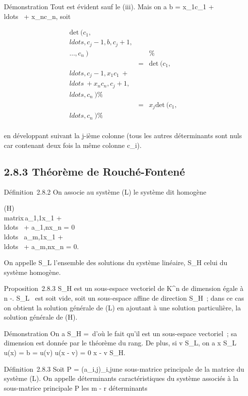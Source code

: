 \documentclass[]{article}
\begin{document}
Démonstration Tout est évident sauf le (iii). Mais on a b =
x_1c_1 +
\\ldots~ +
x_nc_n, soit

\begin{align*}
\mathrm{det}~
(c_1,\\ldots,c_j-1,b,c_j+1,\\\ldots,c_n~)&&
\%& \\ & =&
\mathrm{det}~
(c_1,\\ldots,c_j-1,x_1c_1~
+ \\ldots~ +
x_nc_n,c_j+1,\\ldots,c_n~)\%&
\\ & =&
x_j \mathrm{det}~
(c_1,\\ldots,c_n~)
\%& \\ \end{align*}

en développant suivant la j-ième colonne (tous les autres déterminants
sont nuls car contenant deux fois la même colonne c_i).

\subsection{2.8.3 Théorème de Rouché-Fontené}

Définition~2.8.2 On associe au système (L) le système dit homogène

(H)\quad \left
\\matrix\,a_1,1x_1
+ \\ldots~ +
a_1,nx_n = 0 \cr
\\ldots~
\cr a_m,1x_1 +
\\ldots~ +
a_m,nx_n = 0\right .

On appelle S_L l'ensemble des solutions du système linéaire,
S_H celui du système homogène.

Proposition~2.8.3 S_H est un sous-espace vectoriel de
K^n de dimension égale à n
-\mathrmrgL. S_L~
est soit vide, soit un sous-espace affine de direction S_H~;
dans ce cas on obtient la solution générale de (L) en ajoutant à une
solution particulière, la solution générale de (H).

Démonstration On a S_H =\
\mathrmKeru d'où le fait qu'il est un sous-espace
vectoriel~; sa dimension est donnée par le théorème du rang. De plus, si
v \in S_L, on a x \in S_L \Leftrightarrow
u(x) = b = u(v) \Leftrightarrow u(x - v) = 0
\Leftrightarrow x - v \in S_H.

Définition~2.8.3 Soit P = (a_i,j)_i\inI,j\inJ une
sous-matrice principale de la matrice du système (L). On appelle
déterminants caractéristiques du système associés à la sous-matrice
principale P les m - r déterminants
\end{document}
